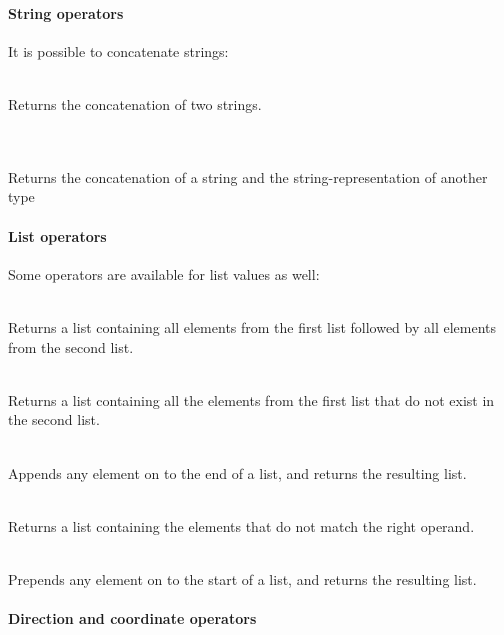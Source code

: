 \paragraph{String operators}

It is possible to concatenate strings:

\begin{dlist}
  \item {} \\
    Returns the concatenation of two strings.
  \item {} \\
    \\
    Returns the concatenation of a string and the string-representation of another type
\end{dlist}

\paragraph{List operators}

Some operators are available for list values as well:

\begin{dlist}
\item {} \\
  Returns a list containing all elements from the first list followed
  by all elements from the second list.
\item {} \\
  Returns a list containing all the elements from the first list that
  do not exist in the second list.
\item {} \\
  Appends any element on to the end of a list, and returns the resulting list.
\item \operator[List]{-}{\opstar} \\
  Returns a list containing the elements that do not match the right operand.
\item {} \\
  Prepends any element on to the start of a list, and returns the resulting list.
\end{dlist}

\paragraph{Direction and coordinate operators}

